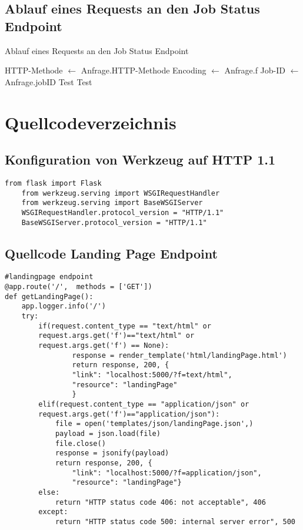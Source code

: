 \subsection{Ablauf eines Requests an den Job Status Endpoint}
\begin{algorithm}[H]
\scriptsize
\caption{Ablauf eines Requests an den Job Status Endpoint}\label{appendixpsedoJobStatus}
\begin{algorithmic}     
    \STATE HTTP-Methode $\gets$ Anfrage.HTTP-Methode
    \STATE Encoding $\gets$ Anfrage.f
    \STATE Job-ID $\gets$ Anfrage.jobID
        \STATE Test
        \STATE Test
    \ELSE{}
    \ENDIF{}
\end{algorithmic}
\end{algorithm}

\renewcommand{\lstlistingname}{Quellcode}
\section{Quellcodeverzeichnis}
\subsection{Konfiguration von Werkzeug auf HTTP 1.1}
\begin{lstlisting}[caption={Konfiguration von Werkzeug auf HTTP 1.1}, style = Python]
    from flask import Flask
    from werkzeug.serving import WSGIRequestHandler
    from werkzeug.serving import BaseWSGIServer
    WSGIRequestHandler.protocol_version = "HTTP/1.1"
    BaseWSGIServer.protocol_version = "HTTP/1.1"
\end{lstlisting}\label{appendixconfWerkzeug}

\subsection{Quellcode Landing Page Endpoint}
\begin{lstlisting}[caption={Landing Page Endpoint}, style = Python]
#landingpage endpoint
@app.route('/',  methods = ['GET'])
def getLandingPage():
    app.logger.info('/') 
    try:
        if(request.content_type == "text/html" or
        request.args.get('f')=="text/html" or 
        request.args.get('f') == None):
                response = render_template('html/landingPage.html') 
                return response, 200, {
                "link": "localhost:5000/?f=text/html", 
                "resource": "landingPage"
                } 
        elif(request.content_type == "application/json" or
        request.args.get('f')=="application/json"): 
            file = open('templates/json/landingPage.json',) 
            payload = json.load(file) 
            file.close() 
            response = jsonify(payload) 
            return response, 200, {
                "link": "localhost:5000/?f=application/json", 
                "resource": "landingPage"} 
        else:
            return "HTTP status code 406: not acceptable", 406 
        except:
            return "HTTP status code 500: internal server error", 500 
\end{lstlisting}\label{appendixLandingPage}

